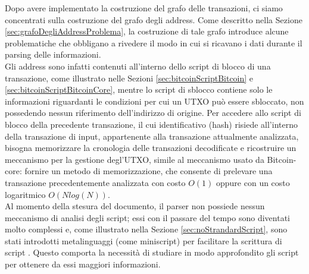 Dopo avere implementato la  costruzione del grafo delle transazioni, ci siamo concentrati sulla costruzione del grafo degli address. Come descritto nella Sezione \ref{sec:grafoDegliAddressProblema}, la costruzione di tale grafo introduce alcune problematiche che obbligano a rivedere il modo in cui si ricavano i dati durante il parsing delle informazioni.\\
Gli address sono infatti contenuti all'interno dello script di blocco di una transazione, come illustrato nelle Sezioni \ref{sec:bitcoinScriptBitcoin} e \ref{sec:bitcoinScriptBitcoinCore}, mentre lo script di sblocco contiene solo le informazioni riguardanti le condizioni per cui un UTXO può essere sbloccato, non possedendo nessun riferimento dell'indirizzo di origine.
Per accedere allo script di blocco della precedente transazione, il cui identificativo (hash) risiede all'interno della transazione di input, appartenente alla transazione attualmente analizzata, bisogna memorizzare la cronologia delle transazioni decodificate e ricostruire un meccanismo per la gestione degl'UTXO, simile al meccanismo usato da Bitcoin-core: fornire un metodo di memorizzazione, che consente di prelevare una transazione precedentemente analizzata con costo $O(1)$ oppure con un costo logaritmico $O(N log(N))$.\\
Al momento della stesura del documento, il parser non possiede nessun meccanismo di analisi degli script; essi con il passare del tempo sono diventati molto complessi e, come illustrato nella Sezione \ref{sec:noStrandardScript}, sono stati   introdotti metalinguaggi (come miniscript) per facilitare la scrittura di script . Questo comporta la necessità di studiare in modo approfondito gli script per ottenere da essi maggiori informazioni.

